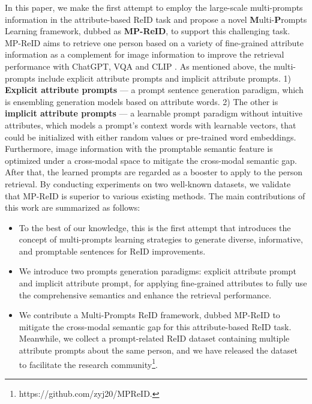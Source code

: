 \documentclass[letterpaper]{article} %
\begin{document}
In this paper, we make the first attempt to employ the large-scale multi-prompts information in the attribute-based ReID task and propose a novel \textbf{M}ulti-\textbf{P}rompts Learning framework, dubbed as \textbf{MP-ReID}, to support this challenging task. MP-ReID aims to retrieve one person based on a variety of fine-grained attribute information as a complement for image information to improve the retrieval performance with ChatGPT, VQA and CLIP \cite{radford2021learning}. As mentioned above, the multi-prompts include explicit attribute prompts and implicit attribute prompts. 1) \textbf{Explicit attribute prompts} --- a prompt sentence generation paradigm, which is ensembling generation models based on attribute words. 2) The other is \textbf{implicit attribute prompts} --- a learnable prompt paradigm without intuitive attributes, which models a prompt’s context words with learnable vectors, that could be initialized with either random values or pre-trained word embeddings. Furthermore, image information with the promptable semantic feature is optimized under a cross-modal space to mitigate the cross-modal semantic gap. After that, the learned prompts are regarded as a booster to apply to the person retrieval. By conducting experiments on two well-known datasets, we validate that MP-ReID is superior to various existing methods. The main contributions of this work are summarized as follows:
\begin{itemize}[leftmargin=*]
\item{To the best of our knowledge, this is the first attempt that introduces the concept of multi-prompts learning strategies to generate diverse, informative, and promptable sentences for ReID improvements.} 
\item{We introduce two prompts generation paradigms: explicit attribute prompt and implicit attribute prompt, for applying fine-grained attributes to fully use the comprehensive semantics and enhance the retrieval performance.}
\item{We contribute a Multi-Prompts ReID framework, dubbed MP-ReID to mitigate the cross-modal semantic gap for this attribute-based ReID task. Meanwhile, we collect a prompt-related ReID dataset containing multiple attribute prompts about the same person, and we have released the dataset to facilitate the research community\footnote{https://github.com/zyj20/MPReID.}.}
\end{itemize}
\end{document}

